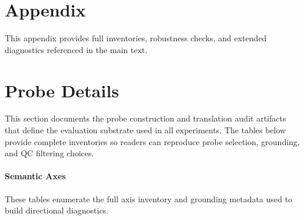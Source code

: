 \documentclass[11pt]{article}
\begin{document}
\appendix
\clearpage
\FloatBarrier
\section*{Appendix}
\label{sec:appendix}

This appendix provides full inventories, robustness checks, and extended diagnostics referenced in the main text.

\renewcommand{\thesection}{A.\arabic{section}}
\section{Probe Details}
\label{sec:probe-details}
This section documents the probe construction and translation audit artifacts that define the evaluation substrate used in all experiments. The tables below provide complete inventories so readers can reproduce probe selection, grounding, and QC filtering choices.

\paragraph{Semantic Axes}
These tables enumerate the full axis inventory and grounding metadata used to build directional diagnostics.

\begin{table}[p]
\centering
\tiny
\resizebox{0.95\textwidth}{!}{}
\caption{Complete list of 50 semantic axes used in all experiments. Axes are fixed before analysis and reused across all language settings.}
\label{tab:appendix-axes}
\end{table}

\begin{table}[p]
\centering
\tiny
\resizebox{0.95\textwidth}{!}{}
\caption{Mapping of 50 semantic axes to literature-grounded categories and framework dimensions (Part I: axes 1--25).}
\label{tab:appendix-axis-grounding}
\end{table}

\begin{table}[p]
\centering
\tiny
\resizebox{0.95\textwidth}{!}{}
\caption{Mapping of 50 semantic axes to literature-grounded categories and framework dimensions (Part II: axes 26--50).}
\label{tab:appendix-axis-grounding-2}
\end{table}
\end{document}
